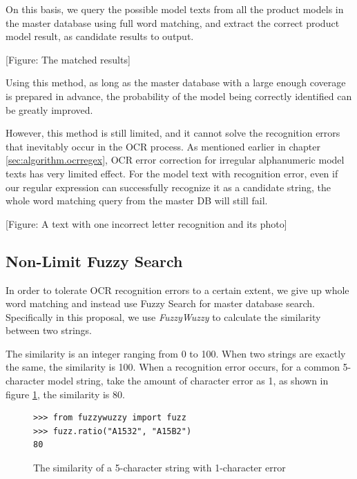 \documentclass[technicalreport]{ieicej}
\begin{document}
        On this basis, we query the possible model texts from all the product models in the master database using full word matching, and extract the correct product model result, as candidate results to output.
    
        \vspace*{\baselineskip}
        [Figure: The matched results]
        \vspace*{\baselineskip}
    
        Using this method, as long as the master database with a large enough coverage is prepared in advance, the probability of the model being correctly identified can be greatly improved.
        
        However, this method is still limited, and it cannot solve the recognition errors that inevitably occur in the OCR process. As mentioned earlier in chapter \ref{sec:algorithm.ocrregex}, OCR error correction for irregular alphanumeric model texts has very limited effect. For the model text with recognition error, even if our regular expression can successfully recognize it as a candidate string, the whole word matching query from the master DB will still fail.
    
        \vspace*{\baselineskip}
        [Figure: A text with one incorrect letter recognition and its photo]
        \vspace*{\baselineskip}
    
    \subsection {Non-Limit Fuzzy Search}
        In order to tolerate OCR recognition errors to a certain extent, we give up whole word matching and instead use Fuzzy Search for master database search. Specifically in this proposal, we use {\em FuzzyWuzzy} to calculate the similarity between two strings.
        
        The similarity is an integer ranging from 0 to 100. When two strings are exactly the same, the similarity is 100. When a recognition error occurs, for a common 5-character model string, take the amount of character error as 1, as shown in figure \ref{fig:code_fuzzwuzzy}, the similarity is 80.
        
        \begin{figure}[tb]
            \begin{lstlisting}
>>> from fuzzywuzzy import fuzz
>>> fuzz.ratio("A1532", "A15B2")
80          \end{lstlisting}
            \caption{The similarity of a 5-character string with 1-character error}
            \label{fig:code_fuzzwuzzy}
        \end{figure}
        
\end{document}
